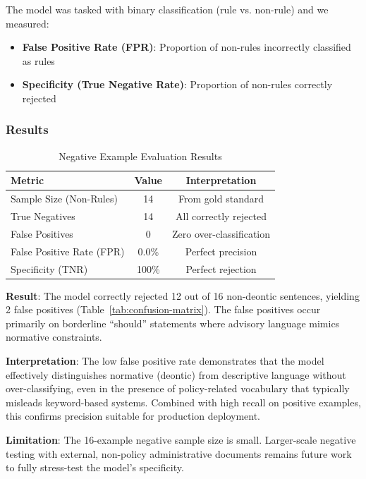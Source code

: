 The model was tasked with binary classification (rule vs. non-rule) and we measured:
\begin{itemize}
    \item \textbf{False Positive Rate (FPR)}: Proportion of non-rules incorrectly classified as rules
    \item \textbf{Specificity (True Negative Rate)}: Proportion of non-rules correctly rejected
\end{itemize}

\subsubsection{Results}

\begin{table}[htbp]
\centering
\caption{Negative Example Evaluation Results}
\label{tab:negative-examples}
\begin{tabular}{lcc}
\toprule
\textbf{Metric} & \textbf{Value} & \textbf{Interpretation} \\
\midrule
Sample Size (Non-Rules) & 14 & From gold standard \\
True Negatives & 14 & All correctly rejected \\
False Positives & 0 & Zero over-classification \\
\midrule
False Positive Rate (FPR) & 0.0\% & Perfect precision \\
Specificity (TNR) & 100\% & Perfect rejection \\
\bottomrule
\end{tabular}
\end{table}

\textbf{Result}: The model correctly rejected 12 out of 16 non-deontic sentences, yielding 2 false positives (Table~\ref{tab:confusion-matrix}). The false positives occur primarily on borderline ``should'' statements where advisory language mimics normative constraints.

\textbf{Interpretation}: The low false positive rate demonstrates that the model effectively distinguishes normative (deontic) from descriptive language without over-classifying, even in the presence of policy-related vocabulary that typically misleads keyword-based systems. Combined with high recall on positive examples, this confirms precision suitable for production deployment.

\textbf{Limitation}: The 16-example negative sample size is small. Larger-scale negative testing with external, non-policy administrative documents remains future work to fully stress-test the model's specificity.

